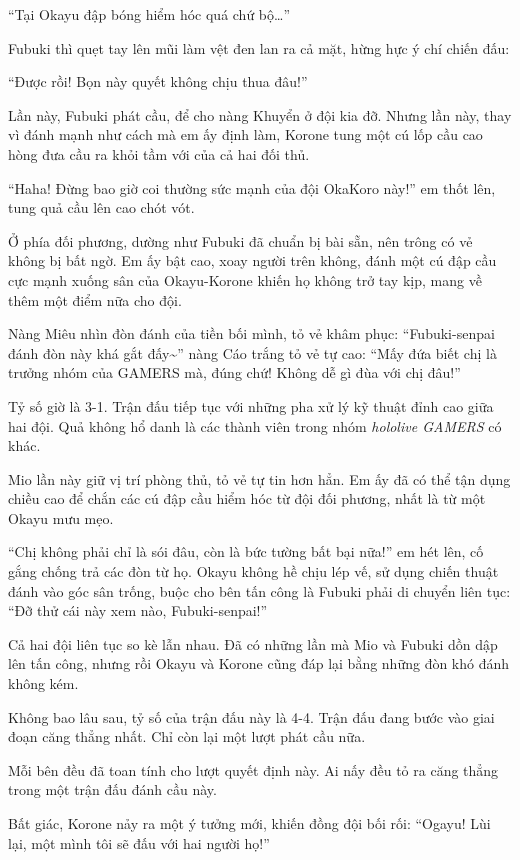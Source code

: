 \documentclass[../main.tex]{subfiles}
\begin{document}
``Tại Okayu đập bóng hiểm hóc quá chứ bộ\dots''

Fubuki thì quẹt tay lên mũi làm vệt đen lan ra cả mặt, hừng hực ý chí chiến đấu:

``Được rồi! Bọn này quyết không chịu thua đâu!''

Lần này, Fubuki phát cầu, để cho nàng Khuyển ở đội kia đỡ. Nhưng lần này, thay vì đánh mạnh như cách mà em ấy định làm, Korone tung một cú lốp cầu cao hòng đưa cầu ra khỏi tầm với của cả hai đối thủ.

``Haha! Đừng bao giờ coi thường sức mạnh của đội OkaKoro này!'' em thốt lên, tung quả cầu lên cao chót vót.

Ở phía đối phương, dường như Fubuki đã chuẩn bị bài sẵn, nên trông có vẻ không bị bất ngờ. Em ấy bật cao, xoay người trên không, đánh một cú đập cầu cực mạnh xuống sân của Okayu-Korone khiến họ không trở tay kịp, mang về thêm một điểm nữa cho đội.

Nàng Miêu nhìn đòn đánh của tiền bối mình, tỏ vẻ khâm phục: ``Fubuki-senpai đánh đòn này khá gắt đấy\~{}'' nàng Cáo trắng tỏ vẻ tự cao: ``Mấy đứa biết chị là trưởng nhóm của GAMERS mà, đúng chứ! Không dễ gì đùa với chị đâu!''

Tỷ số giờ là 3-1. Trận đấu tiếp tục với những pha xử lý kỹ thuật đỉnh cao giữa hai đội. Quả không hổ danh là các thành viên trong nhóm \textit{hololive GAMERS} có khác.

Mio lần này giữ vị trí phòng thủ, tỏ vẻ tự tin hơn hẳn. Em ấy đã có thể tận dụng chiều cao để chắn các cú đập cầu hiểm hóc từ đội đối phương, nhất là từ một Okayu mưu mẹo.

``Chị không phải chỉ là sói đâu, còn là bức tường bất bại nữa!'' em hét lên, cố gắng chống trả các đòn từ họ. Okayu không hề chịu lép vế, sử dụng chiến thuật đánh vào góc sân trống, buộc cho bên tấn công là Fubuki phải di chuyển liên tục: ``Đỡ thử cái này xem nào, Fubuki-senpai!''

Cả hai đội liên tục so kè lẫn nhau. Đã có những lần mà Mio và Fubuki dồn dập lên tấn công, nhưng rồi Okayu và Korone cũng đáp lại bằng những đòn khó đánh không kém.

Không bao lâu sau, tỷ số của trận đấu này là 4-4. Trận đấu đang bước vào giai đoạn căng thẳng nhất. Chỉ còn lại một lượt phát cầu nữa.

Mỗi bên đều đã toan tính cho lượt quyết định này. Ai nấy đều tỏ ra căng thẳng trong một trận đấu đánh cầu này.

Bất giác, Korone nảy ra một ý tưởng mới, khiến đồng đội bối rối: ``Ogayu! Lùi lại, một mình tôi sẽ đấu với hai người họ!''
\end{document}
